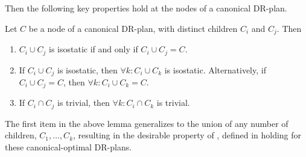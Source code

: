 Then the following key properties hold at the nodes of a canonical DR-plan.

\begin{lemma*}\label{lemma:combined_lemma}
Let $C$ be a node of a canonical DR-plan, with distinct children $C_i$ and $C_j$.
Then
\begin{enumerate}
    \item\label{lemma:wc_intersection_is_C}
    $C_i\cup C_j$ is isostatic if and only if $C_i\cup C_j = C$.

    \item\label{lemma:wc_intersection_makes_all_wc}
    If $C_i\cup C_j$ is isostatic, then $\forall k: C_i\cup C_k$ is isostatic. Alternatively, if $C_i\cup C_j=C$, then $\forall k: C_i\cup C_k=C$.

    \item\label{lemma:uc_intersection_makes_all_uc}
    If $C_i\cap C_j$ is trivial, then $\forall k: C_i\cap C_k$ is trivial.
\end{enumerate}
\end{lemma*}

\begin{remark}
The first item in the above lemma generalizes to the union of any number of children, $C_1,\ldots,C_k$, resulting in the desirable property of , defined in \cite{hoffman2001decompositionI} holding for these canonical-optimal DR-plans.
\end{remark}






%     
%     




